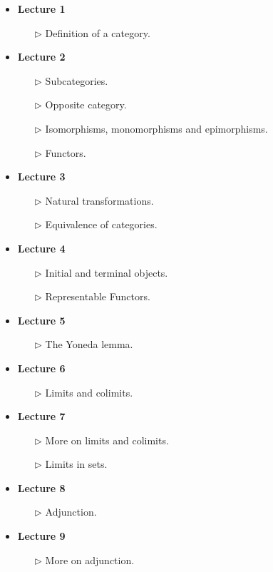
\vspace*{1em}

\begin{itemize}
\item \textbf{Lecture 1}
\begin{itemize}
\item[$\rhd$] Definition of a category.
\end{itemize}

\item \textbf{Lecture 2}
\begin{itemize}
\item[$\rhd$] Subcategories.
\item[$\rhd$] Opposite category.
\item[$\rhd$] Isomorphisms, monomorphisms and epimorphisms.
\item[$\rhd$] Functors.
\end{itemize}

\item \textbf{Lecture 3}
\begin{itemize}
\item[$\rhd$] Natural transformations.
\item[$\rhd$] Equivalence of categories.
\end{itemize}

\item \textbf{Lecture 4}
\begin{itemize}
\item[$\rhd$] Initial and terminal objects.
\item[$\rhd$] Representable Functors.
\end{itemize}

\item \textbf{Lecture 5}
\begin{itemize}
\item[$\rhd$] The Yoneda lemma.
\end{itemize}

\item \textbf{Lecture 6}
\begin{itemize}
\item[$\rhd$] Limits and colimits.
\end{itemize}

\item \textbf{Lecture 7}
\begin{itemize}
\item[$\rhd$] More on limits and colimits.
\item[$\rhd$] Limits in sets.
\end{itemize}

\item \textbf{Lecture 8}
\begin{itemize}
\item[$\rhd$] Adjunction.
\end{itemize}

\item \textbf{Lecture 9}
\begin{itemize}
\item[$\rhd$] More on adjunction.
\end{itemize}
\end{itemize}
